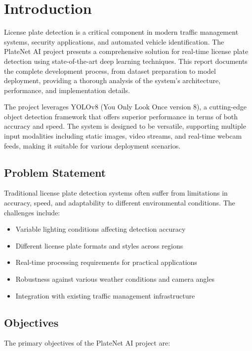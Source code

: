 \documentclass[12pt,a4paper]{article}
\begin{document}
\section{Introduction}

License plate detection is a critical component in modern traffic management systems, security applications, and automated vehicle identification. The PlateNet AI project presents a comprehensive solution for real-time license plate detection using state-of-the-art deep learning techniques. This report documents the complete development process, from dataset preparation to model deployment, providing a thorough analysis of the system's architecture, performance, and implementation details.

The project leverages YOLOv8 (You Only Look Once version 8), a cutting-edge object detection framework that offers superior performance in terms of both accuracy and speed. The system is designed to be versatile, supporting multiple input modalities including static images, video streams, and real-time webcam feeds, making it suitable for various deployment scenarios.

\subsection{Problem Statement}

Traditional license plate detection systems often suffer from limitations in accuracy, speed, and adaptability to different environmental conditions. The challenges include:

\begin{itemize}
    \item Variable lighting conditions affecting detection accuracy
    \item Different license plate formats and styles across regions
    \item Real-time processing requirements for practical applications
    \item Robustness against various weather conditions and camera angles
    \item Integration with existing traffic management infrastructure
\end{itemize}

\subsection{Objectives}

The primary objectives of the PlateNet AI project are:
\end{document}
